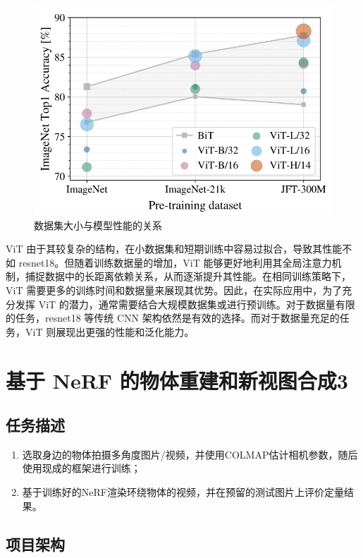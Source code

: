 \documentclass[notitlepage,cs4size,punct,oneside]{ctexrep}
\numberwithin{equation}{chapter}
\theoremstyle{mystyle}
\begin{document}
\begin{figure}[H]
    \centering
    \includegraphics[scale=0.75]{ViT_vs_CNN.png}
    \caption{数据集大小与模型性能的关系}
\end{figure}

ViT 由于其较复杂的结构，在小数据集和短期训练中容易过拟合，导致其性能不如 resnet18。但随着训练数据量的增加，ViT 能够更好地利用其全局注意力机制，捕捉数据中的长距离依赖关系，从而逐渐提升其性能。在相同训练策略下，ViT 需要更多的训练时间和数据量来展现其优势。因此，在实际应用中，为了充分发挥 ViT 的潜力，通常需要结合大规模数据集或进行预训练。对于数据量有限的任务，resnet18 等传统 CNN 架构依然是有效的选择。而对于数据量充足的任务，ViT 则展现出更强的性能和泛化能力。

\chapter{基于 NeRF 的物体重建和新视图合成3}
\section{任务描述}
\begin{enumerate}
\item 选取身边的物体拍摄多角度图片/视频，并使用COLMAP估计相机参数，随后使用现成的框架进行训练；
\item 基于训练好的NeRF渲染环绕物体的视频，并在预留的测试图片上评价定量结果。
\end{enumerate}

\section{项目架构}
\end{document}
